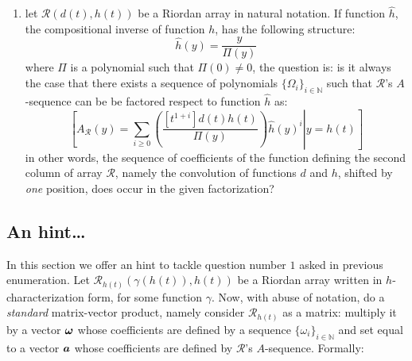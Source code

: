 \begin{enumerate}
    \item let $\mathcal{R}(d(t),h(t))$ be a Riordan array in 
        natural notation. If function $\hat{h}$, the compositional inverse
        of function $h$, has the following structure:
        \begin{displaymath}
            \hat{h}(y) = \frac{y}{\Pi(y)}
        \end{displaymath}
        where $\Pi$ is a polynomial such that $\Pi(0)\not=0$, the question is:
        is it always the case that there exists a sequence of polynomials
        $\lbrace \Omega_{i} \rbrace_{i\in\mathbb{N}}$ such
        that $\mathcal{R}$'s $A$-sequence can be be factored respect to
        function $\hat{h}$ as:
        \begin{displaymath}
                \left.\left[
                    A_{\mathcal{R}}(y) = \sum_{i \geq0}{
                        \left(\frac{[t^{1+i}]d(t)h(t)}
                            {\Pi(y)}\right)
                        \hat{h}(y)^{i}} 
                        \right| y = h(t) \right]
        \end{displaymath}
        in other words, the sequence of coefficients of the function defining
        the second column of array $\mathcal{R}$, namely the convolution of functions 
        $d$ and $h$, shifted by \emph{one} position, does occur in
        the given factorization?

\end{enumerate}

\subsection{An hint\ldots}

In this section we offer an hint to tackle question number $1$
asked in previous enumeration. Let $\mathcal{R}_{h(t)}(\gamma(h(t)), h(t))$
be a Riordan array written in $h$-characterization form, for some function $\gamma$. 
Now, with abuse of notation, do a \emph{standard} matrix-vector product, namely
consider $\mathcal{R}_{h(t)}$ as a matrix: multiply it by a vector $\boldsymbol{\omega}$
whose coefficients are defined by a sequence $\lbrace \omega_i \rbrace_{i\in\mathbb{N}}$
and set equal to a vector $\boldsymbol{a}$ whose coefficients are defined by $\mathcal{R}$'s
$A$-sequence. Formally:

